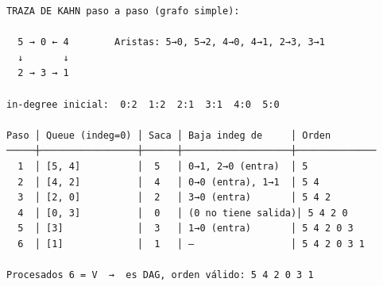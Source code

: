 \begin{dsacomofunciona}
\begin{verbatim}
TRAZA DE KAHN paso a paso (grafo simple):

  5 → 0 ← 4        Aristas: 5→0, 5→2, 4→0, 4→1, 2→3, 3→1
  ↓       ↓
  2 → 3 → 1

in-degree inicial:  0:2  1:2  2:1  3:1  4:0  5:0

Paso │ Queue (indeg=0) │ Saca │ Baja indeg de     │ Orden
─────┼─────────────────┼──────┼───────────────────┼──────────────
  1  │ [5, 4]          │  5   │ 0→1, 2→0 (entra)  │ 5
  2  │ [4, 2]          │  4   │ 0→0 (entra), 1→1  │ 5 4
  3  │ [2, 0]          │  2   │ 3→0 (entra)       │ 5 4 2
  4  │ [0, 3]          │  0   │ (0 no tiene salida)│ 5 4 2 0
  5  │ [3]             │  3   │ 1→0 (entra)       │ 5 4 2 0 3
  6  │ [1]             │  1   │ —                 │ 5 4 2 0 3 1

Procesados 6 = V  →  es DAG, orden válido: 5 4 2 0 3 1
\end{verbatim}
\end{dsacomofunciona}

